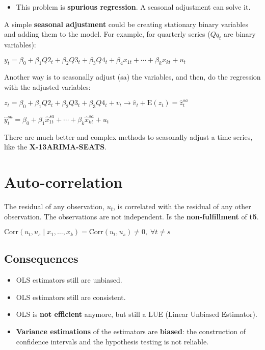 \documentclass[10pt, a4paper, landscape]{extarticle}
\newcommand{\E}{\mathrm{E}}
\newcommand{\Corr}{\mathrm{Corr}}
\begin{document}
\begin{multicols}{3}
\begin{multicols}{2}
\end{multicols}

\begin{itemize}[leftmargin=*]
	\item This problem is \textbf{spurious regression}. A seasonal adjustment can solve it.
\end{itemize}

A simple \textbf{seasonal adjustment} could be creating stationary binary variables and adding them to the model. For example, for quarterly series ($Qq_t$ are binary variables):

\begin{center}
	$y_t = \beta_0 + \beta_1 Q2_t + \beta_2 Q3_t + \beta_3 Q4_t + \beta_4 x_{1t} + \cdots + \beta_k x_{kt} + u_t$
\end{center}

Another way is to seasonally adjust (sa) the variables, and then, do the regression with the adjusted variables:

\begin{center}
	$z_t = \beta_0 + \beta_1 Q2_t + \beta_2 Q3_t + \beta_3 Q4_t  + v_t \rightarrow \hat{v}_t + \E(z_t) = \hat{z}_t^{sa}$

	$\hat{y}_t^{sa} = \beta_0 + \beta_1 \hat{x}_{1t}^{sa} + \cdots + \beta_k \hat{x}_{kt}^{sa} + u_t$
\end{center}

There are much better and complex methods to seasonally adjust a time series, like the \textbf{X-13ARIMA-SEATS}.

\columnbreak

\section*{Auto-correlation}

The residual of any observation, $u_t$, is correlated with the residual of any other observation. The observations are not independent. Is the \textbf{non-fulfillment} of \textbf{t5}.

\begin{center}
	$\Corr(u_t, u_s \mid x_1, \ldots, x_k) = \Corr(u_t, u_s) \neq 0, \; \forall t \neq s$
\end{center}

\subsection*{Consequences}

\begin{itemize}[leftmargin=*]
	\item OLS estimators still are unbiased.
	\item OLS estimators still are consistent.
	\item OLS is \textbf{not efficient} anymore, but still a LUE (Linear Unbiased Estimator).
	\item \textbf{Variance estimations} of the estimators are \textbf{biased}: the construction of confidence intervals and the hypothesis testing is not reliable.
\end{itemize}


\end{multicols}
\end{document}
